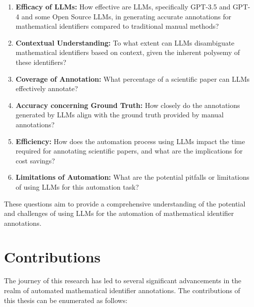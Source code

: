 \begin{enumerate}
    \item \textbf{Efficacy of LLMs:} How effective are LLMs, specifically GPT-3.5 and GPT-4 and some Open Source LLMs, in generating accurate annotations for mathematical identifiers compared to traditional manual methods?
    
    \item \textbf{Contextual Understanding:} To what extent can LLMs disambiguate mathematical identifiers based on context, given the inherent polysemy of these identifiers?
    
    \item \textbf{Coverage of Annotation:} What percentage of a scientific paper can LLMs effectively annotate?
    
    \item \textbf{Accuracy concerning Ground Truth:} How closely do the annotations generated by LLMs align with the ground truth provided by manual annotations?
    
    \item \textbf{Efficiency:} How does the automation process using LLMs impact the time required for annotating scientific papers, and what are the implications for cost savings?
    
    \item \textbf{Limitations of Automation:} What are the potential pitfalls or limitations of using LLMs for this automation task?
\end{enumerate}

These questions aim to provide a comprehensive understanding of the potential and challenges of using LLMs for the automation of mathematical identifier annotations.

\section{Contributions}

The journey of this research has led to several significant advancements in the realm of automated mathematical identifier annotations. The contributions of this thesis can be enumerated as follows:

